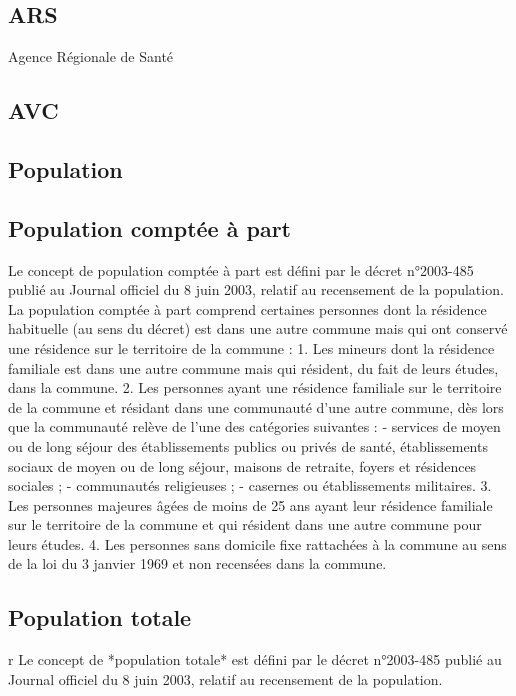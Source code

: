 \documentclass[12pt,english,french,twoside]{book}\usepackage[]{graphicx}\usepackage[]{color}
\begin{document}
\subsection*{ARS}
Agence Régionale de Santé

\subsection*{AVC}

\subsection*{Population}

\subsection*{Population comptée à part}
Le concept de population comptée à part est défini par le décret n°2003-485 publié au Journal officiel du 8 juin 2003, relatif au recensement de la population.
La population comptée à part comprend certaines personnes dont la résidence habituelle (au sens du décret) est dans une autre commune mais qui ont conservé une résidence sur le territoire de la commune :
1. Les mineurs dont la résidence familiale est dans une autre commune mais qui résident, du fait de leurs études, dans la commune.
2. Les personnes ayant une résidence familiale sur le territoire de la commune et résidant dans une communauté d'une autre commune, dès lors que la communauté relève de l'une des catégories suivantes :
- services de moyen ou de long séjour des établissements publics ou privés de santé, établissements sociaux de moyen ou de long séjour, maisons de retraite, foyers et résidences sociales ;
- communautés religieuses ;
- casernes ou établissements militaires.
3. Les personnes majeures âgées de moins de 25 ans ayant leur résidence familiale sur le territoire de la commune et qui résident dans une autre commune pour leurs études.
4. Les personnes sans domicile fixe rattachées à la commune au sens de la loi du 3 janvier 1969 et non recensées dans la commune. \cite{8}


\subsection*{Population totale}
r
Le concept de *population totale* est défini par le décret n°2003-485 publié au Journal officiel du 8 juin 2003, relatif au recensement de la population.
\end{document}
